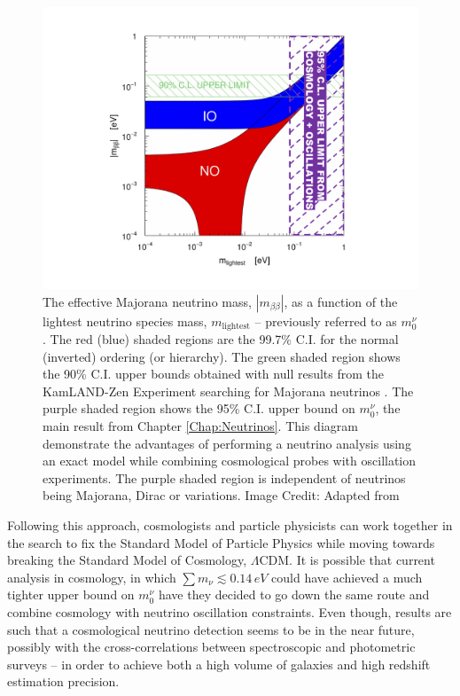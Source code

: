 \begin{figure}
\begin{center}
\includegraphics[scale=0.60]{Intro-FIGS/doublebeta.pdf}
\caption[The effective Majorana neutrino mass, $|m_{\beta\beta}|$, as a function of the lightest neutrino species mass.]{The effective Majorana neutrino mass, $|m_{\beta\beta}|$, as a function of the lightest neutrino species mass, $m_{\text{lightest}}$ -- previously referred to as $m_0^{\nu}$. The red (blue) shaded regions are the 99.7\% C.I. for the normal (inverted) ordering (or hierarchy). The green shaded region shows the 90\% C.I. upper bounds obtained with null results from the KamLAND-Zen Experiment searching for Majorana neutrinos \citep{2016KamLANDMajorana}. The purple shaded region shows the 95\% C.I. upper bound on $m_{0}^{\nu}$, the main result from Chapter \ref{Chap:Neutrinos}. This diagram demonstrate the advantages of performing a neutrino analysis using an exact model while combining cosmological probes with oscillation experiments. The purple shaded region is independent of neutrinos being Majorana, Dirac or variations. Image Credit: Adapted from \cite{2018MassOrdering}}
\label{fig:Major}
\end{center}
\end{figure}

\qquad Following this approach, cosmologists and particle physicists can work together in the search to fix the Standard Model of Particle Physics while moving towards breaking the Standard Model of Cosmology, $\Lambda$CDM. It is possible that current analysis in cosmology, in which $\sum m_{\nu} \lesssim 0.14\, eV$ \cite{2015LyAlpha-Deg,2016Cuesta-Deg} could have achieved a much tighter upper bound on $m_0^{\nu}$ have they decided to go down the same route and combine cosmology with neutrino oscillation constraints. Even though, results are such that a cosmological neutrino detection seems to be in the near future, possibly with the cross-correlations between spectroscopic and photometric surveys -- in order to achieve both a high volume of galaxies and high redshift estimation precision.

